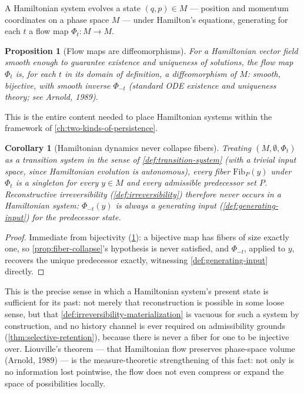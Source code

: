 \documentclass[11pt]{book}
\theoremstyle{plain}
\newtheorem{proposition}[theorem]{Proposition}
\newtheorem{corollary}[theorem]{Corollary}
\theoremstyle{definition}
\theoremstyle{remark}
\begin{document}
A Hamiltonian system evolves a state $(q, p) \in M$ --- position and
momentum coordinates on a phase space $M$ --- under Hamilton's
equations, generating for each $t$ a flow map $\Phi_t : M \to M$.

\begin{proposition}[Flow maps are diffeomorphisms]
\label{prop:hamiltonian-bijective}
For a Hamiltonian vector field smooth enough to guarantee existence
and uniqueness of solutions, the flow map $\Phi_t$ is, for each $t$
in its domain of definition, a diffeomorphism of $M$: smooth,
bijective, with smooth inverse $\Phi_{-t}$ (standard ODE existence
and uniqueness theory; see Arnold, 1989).
\end{proposition}

This is the entire content needed to place Hamiltonian systems within
the framework of \cref{ch:two-kinds-of-persistence}.

\begin{corollary}[Hamiltonian dynamics never collapse fibers]
\label{cor:hamiltonian-no-collapse}
Treating $(M, \emptyset, \Phi_t)$ as a transition system in the sense
of \cref{def:transition-system} (with a trivial input space, since
Hamiltonian evolution is autonomous), every fiber
$\mathrm{Fib}_P(y)$ under $\Phi_t$ is a singleton for every $y \in M$
and every admissible predecessor set $P$. Reconstructive
irreversibility (\cref{def:irreversibility}) therefore never occurs
in a Hamiltonian system: $\Phi_{-t}(y)$ is always a generating input
(\cref{def:generating-input}) for the predecessor state.
\end{corollary}

\begin{proof}
Immediate from bijectivity (\cref{prop:hamiltonian-bijective}): a
bijective map has fibers of size exactly one, so
\cref{prop:fiber-collapse}'s hypothesis is never satisfied, and
$\Phi_{-t}$, applied to $y$, recovers the unique predecessor exactly,
witnessing \cref{def:generating-input} directly.
\end{proof}

This is the precise sense in which a Hamiltonian system's present
state is sufficient for its past: not merely that reconstruction is
possible in some loose sense, but that \cref{def:irreversibility-materialization}
is vacuous for such a system by construction, and no history channel
is ever required on admissibility grounds
(\cref{thm:selective-retention}), because there is never a fiber for
one to be injective over. Liouville's theorem --- that Hamiltonian flow
preserves phase-space volume (Arnold, 1989) --- is the
measure-theoretic strengthening of this fact: not only is no
information lost pointwise, the flow does not even compress or expand
the space of possibilities locally.
\end{document}
